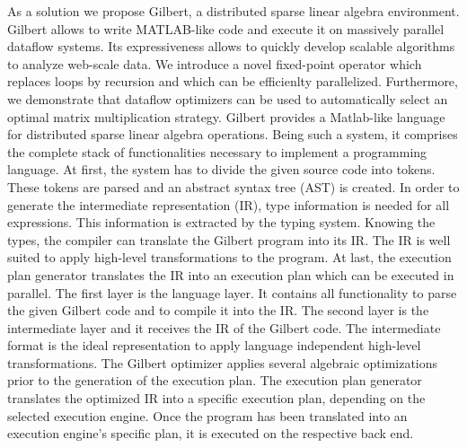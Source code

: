 As a solution we propose Gilbert, a distributed sparse linear algebra environment.
Gilbert allows to write MATLAB-like code and execute it on massively parallel dataflow systems.
Its expressiveness allows to quickly develop scalable algorithms to analyze web-scale data.
We introduce a novel fixed-point operator which replaces loops by recursion and which can be efficienlty parallelized.
Furthermore, we demonstrate that dataflow optimizers can be used to automatically select an optimal matrix multiplication strategy. Gilbert provides a Matlab-like language for distributed sparse linear algebra operations. Being such a system, it comprises the complete stack of functionalities necessary to implement a programming language. At first, the system has to divide the given source code into tokens. These tokens are parsed and an abstract syntax tree (AST) is created. In order to generate the intermediate representation (IR), type information is needed for all expressions. This information is extracted by the typing system. Knowing the types, the compiler can translate the Gilbert program into its IR. The IR is well suited to apply high-level transformations to the program. At last, the execution plan generator translates the IR into an execution plan which can be executed in parallel. %
The first layer is the language layer. It contains all functionality to parse the given Gilbert code and to compile it into the IR. The second layer is the intermediate layer and it receives the IR of the Gilbert code. The intermediate format is the ideal representation to apply language independent high-level transformations. The Gilbert optimizer applies several algebraic optimizations prior to the generation of the execution plan. The execution plan generator translates the optimized IR into a specific execution plan, depending on the selected execution engine. Once the program has been translated into an execution engine's specific plan, it is executed on the respective back end.


